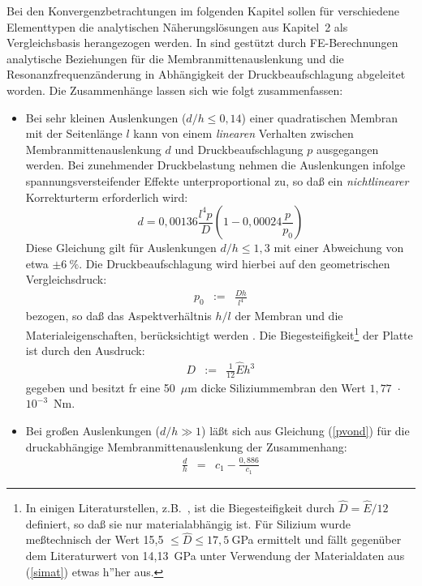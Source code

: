 Bei den Konvergenzbetrachtungen im folgenden Kapitel sollen für
verschiedene Elementtypen die analytischen Näherungslösungen
aus Kapitel~2 als Vergleichsbasis herangezogen werden.
In \cite{Fab92a, Sch92} sind gestützt durch FE-Berechnungen analytische
Beziehungen für die Membranmittenauslenkung und die
Resonanzfrequenzänderung in Abhängigkeit der Druckbeaufschlagung
abgeleitet worden. Die Zusammenhänge lassen sich wie folgt
zusammenfassen:
%
\begin{itemize}
\item Bei sehr kleinen Auslenkungen ($d/h \leq 0,14$) einer quadratischen
Membran mit der Seitenlänge $l$ kann von einem {\em linearen} Verhalten
zwischen
Membranmittenauslenkung $d$ und Druckbeaufschlagung $p$ ausgegangen werden.
Bei zunehmender Druckbelastung nehmen die Auslenkungen infolge
spannungsversteifender Effekte unterproportional zu, so daß ein
{\em nichtlinearer} Korrekturterm erforderlich wird:
\begin{equation}
\label{nonlin1}
 d = 0,00136 \frac{l^{4}p}{D} \left(1 - 0,00024 \frac{p}{p_{0}} \right)
\end{equation}
Diese Gleichung gilt für Auslenkungen $d/h \leq 1,3$ mit einer Abweichung
von etwa $\pm 6~\%$. Die Druckbeaufschlagung wird hierbei auf den
\glqq geometrischen Vergleichsdruck\grqq:
\begin{eqnarray}
\label{p0D}
 p_{0}   & := & \frac{Dh}{l^{4}} \nonumber
\end{eqnarray}
bezogen, so daß das Aspektverhältnis $h/l$ der Membran und die
Materialeigenschaften, berücksichtigt werden \cite{Pfe89}. Die
Biegesteifigkeit\footnote{In einigen Literaturstellen, z.B.\ \cite{Pon91},
ist
die Biegesteifigkeit durch $\hat D = \hat E/12$ definiert, so daß sie nur
materialabhängig ist. Für Silizium wurde meßtechnisch der Wert
15,5 $\le \hat D \le 17,5~$GPa ermittelt und fällt gegenüber dem
Literaturwert von 14,13~GPa unter Verwendung der Materialdaten aus
(\ref{simat}) etwas h”her aus.} der Platte ist durch
den Ausdruck:
\begin{eqnarray}
\label{biegesteif}
 D & := & \frac{1}{12} \hat E h^{3}
\end{eqnarray}
gegeben und besitzt fr eine 50~$\mu$m dicke Siliziummembran
den Wert $1,77$~$\cdot$~$10^{-3}$~Nm.
%
\item Bei großen Auslenkungen ($d/h \gg 1$) läßt sich aus Gleichung
(\ref{pvond}) für die druckabhängige Membranmittenauslenkung der
Zusammenhang:
\begin{eqnarray}
\label{memausl}
 \frac{d}{h} & = & c_{1} - \frac{0,886}{c_{1}}

\end{eqnarray}
\end{itemize}

